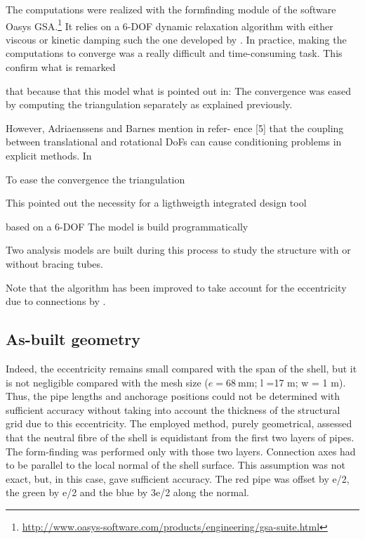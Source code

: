 The computations were realized with the formfinding module of the software Oasys GSA.\footnote{\url{http://www.oasys-software.com/products/engineering/gsa-suite.html}} It relies on a 6-DOF dynamic relaxation algorithm with either viscous or kinetic damping such the one developed by \citet{Adriaenssens2000}. In practice, making the computations to converge was a really difficult and time-consuming task. This confirm what is remarked 

\citeauthor{Barnes1975}

that because that this model what is pointed out in: The convergence was eased by computing the triangulation separately as explained previously.

However, Adriaenssens and Barnes mention in refer- ence [5] that the coupling between translational and rotational DoFs can cause conditioning problems in explicit methods. In

To ease the convergence the triangulation 

This pointed out the necessity for a ligthweigth integrated design tool

based on a 6-DOF The model is build programmatically 

Two analysis models are built during this process to study the structure with or without bracing tubes.


Note that the algorithm has been improved to take account for the eccentricity due to connections by \citep{Douthe2006}.

\subsection{As-built geometry}\label{sec:asbuilt}
Indeed, the eccentricity remains small compared with the span of the shell, but it is not negligible compared with the mesh size ($e = \SI{68}{\mm} $; l =17 m; w = 1 m). Thus, the pipe lengths and anchorage positions could not be determined with sufficient accuracy without taking into account the thickness of the structural grid due to this eccentricity. The employed method, purely geometrical, assessed that the neutral fibre of the shell is equidistant from the first two layers of pipes. The form-finding was performed only with those two layers. Connection axes had to be parallel to the local normal of the shell surface. This assumption was not exact, but, in this case, gave sufficient accuracy. The red pipe was offset by e/2, the green by e/2 and the blue by 3e/2 along the normal.

